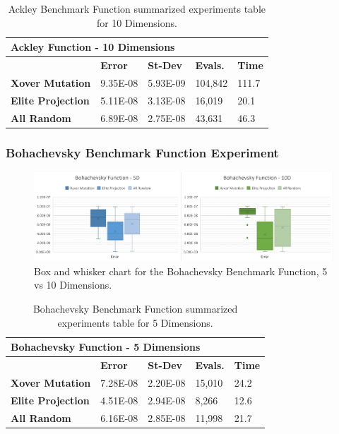 \documentclass[graybox]{svmult}
\begin{document}
\begin{table}[]
    \scriptsize
    \centering
    \caption{Ackley Benchmark Function summarized experiments table for 10 Dimensions.}\label{tab.fun_ackley10}
    \begin{tabular}{@{}lllll@{}}
    \toprule
    \multicolumn{5}{l}{\textbf{Ackley Function - 10 Dimensions}} \\ \midrule
     & \textbf{Error} & \textbf{St-Dev} & \textbf{Evals.} & \textbf{Time} \\
    \textbf{Xover Mutation} & 9.35E-08 & 5.93E-09 & 104,842 & 111.7 \\
    \textbf{Elite Projection} & 5.11E-08 & 3.13E-08 & 16,019 & 20.1 \\
    \textbf{All Random} & 6.89E-08 & 2.75E-08 & 43,631 & 46.3 \\ \bottomrule
    \end{tabular}
    \end{table}


\subsubsection{Bohachevsky Benchmark Function Experiment}

\begin{figure}
    \includegraphics[width=\linewidth, frame]{img/fig_fun_bohachevsky.pdf}
    \caption{Box and whisker chart for the Bohachevsky Benchmark Function, 5 vs 10 Dimensions.} \label{fig.fun_bohachevsky}
    \end{figure}

\begin{table}[]
    \scriptsize
    \centering
    \caption{Bohachevsky Benchmark Function summarized experiments table for 5 Dimensions.}\label{tab.fun_bohachevsky5}
    \begin{tabular}{@{}lllll@{}}
    \toprule
    \multicolumn{5}{l}{\textbf{Bohachevsky Function - 5 Dimensions}} \\ \midrule
     & \textbf{Error} & \textbf{St-Dev} & \textbf{Evals.} & \textbf{Time} \\
    \textbf{Xover Mutation} & 7.28E-08 & 2.20E-08 & 15,010 & 24.2 \\
    \textbf{Elite Projection} & 4.51E-08 & 2.94E-08 & 8,266 & 12.6 \\
    \textbf{All Random} & 6.16E-08 & 2.85E-08 & 11,998 & 21.7 \\ \bottomrule
    \end{tabular}
    \end{table}
\end{document}
